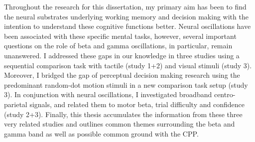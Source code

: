 Throughout the research for this dissertation, my primary aim has been to find the neural substrates underlying working memory and decision making with the intention to understand these cognitive functions better. Neural oscillations have been associated with these specific mental tasks, however, several important questions on the role of beta and gamma oscillations, in particular, remain unanswered. I addressed these gaps in our knowledge in three studies using a sequential comparison task with tactile (study 1+2) and visual stimuli (study 3). Moreover, I bridged the gap of perceptual decision making research using the predominant random-dot motion stimuli in a new comparison task setup (study 3). In conjunction with neural oscillations, I investigated broadband centro-parietal signals, and related them to motor beta, trial difficulty and confidence (study 2+3). Finally, this thesis accumulates the information from these three very related studies and outlines common themes surrounding the beta and gamma band as well as possible common ground with the CPP. 